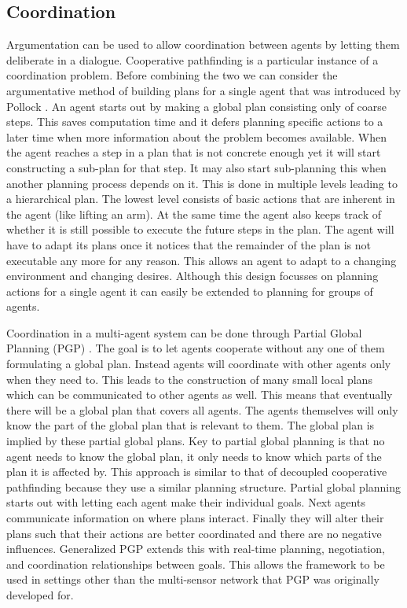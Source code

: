 \subsection{Coordination}
Argumentation can be used to allow coordination between agents by letting them
deliberate in a dialogue. Cooperative pathfinding is a particular instance of a
coordination problem. Before combining the two we can consider the
argumentative method of building plans for a single agent that was introduced
by Pollock \cite{pollock1995}. An agent starts out by making a global plan
consisting only of coarse steps. This saves computation time and it defers
planning specific actions to a later time when more information about the
problem becomes available. When the agent reaches a step in a plan that is not
concrete enough yet it will start constructing a sub-plan for that step. It may
also start sub-planning this when another planning process depends on it. This
is done in
multiple levels leading to a hierarchical plan. The lowest level consists of
basic actions that are inherent in the agent (like lifting an arm). At the same
time the agent also keeps track of whether it is still possible to execute the
future steps in the plan. The agent will have to adapt its plans once it
notices that the remainder of the plan is not executable any more for any
reason. This allows an agent to adapt to a changing environment and changing
desires. Although this design focusses on planning actions for a single agent
it can easily be extended to planning for groups of agents.

Coordination in a multi-agent system can be done through Partial Global
Planning (PGP) \cite[pp. 202--204]{durfee1991,decker1992,woodridge2009}. The
goal is to
let agents cooperate without any one of them formulating a global plan. Instead
agents will coordinate with other agents only when they need to. This leads to
the construction of many small local plans which can be communicated to other
agents as well. This means that eventually there will be a global plan that
covers all agents. The agents themselves will only know the part of the global
plan that is relevant to them. The global plan is implied by these partial
global plans. Key to
partial global planning is that no agent needs to know the global plan, it only
needs to know which parts of the plan it is affected by. This approach is
similar to that of decoupled cooperative pathfinding because they use a similar
planning structure. Partial global planning starts out with letting each agent
make their individual goals. Next agents communicate information on where plans
interact. Finally they will alter their plans such that their actions are
better coordinated and there are no negative influences. Generalized PGP
\cite{decker1992} extends this with real-time planning, negotiation, and
coordination relationships between goals. This allows the framework to be used
in settings other than the multi-sensor network that PGP was originally
developed for.


